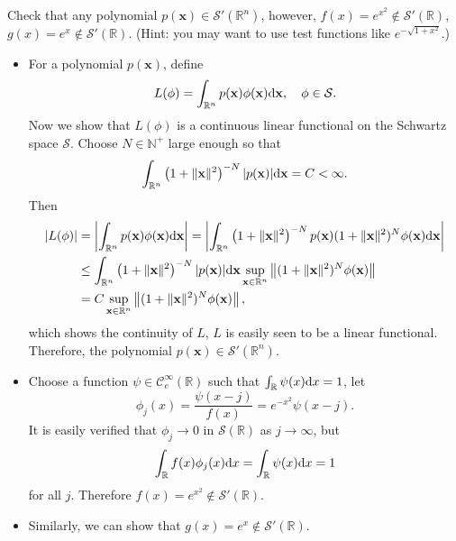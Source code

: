 \begin{pro}
  Check that any polynomial
  $p(\mathbf{x})\in\mathcal{S}'(\mathbb{R}^n)$,
  however,
  $f(x)=e^{x^2}\notin\mathcal{S}'(\mathbb{R})$,
  $g(x)=e^x\notin\mathcal{S}'(\mathbb{R})$.
  (Hint: you may want to use test functions like
  $e^{-\sqrt{1+x^2}}$.)
\end{pro}

\begin{sol}
  \begin{itemize}
  \item
  For a polynomial $p(\mathbf{x})$,
  define
  \begin{displaymath}
    L(\phi) = \int_{\mathbb{R}^n}p(\mathbf{x})\phi(\mathbf{x})\mathrm{d}\mathbf{x}, \quad \phi\in\mathcal{S}.
  \end{displaymath}
  Now we show that $L(\phi)$
  is a continuous linear functional on the Schwartz
  space $\mathcal{S}$.
  Choose $N\in\mathbb{N}^+$ large enough so that
  \begin{displaymath}
    \int_{\mathbb{R}^n}\left( 1+\|\mathbf{x}\|^2\right)^{-N}
    |p(\mathbf{x})|\mathrm{d}\mathbf{x} = C < \infty.
  \end{displaymath}
  Then
  \begin{align*}
    |L(\phi)| &= \left|\int_{\mathbb{R}^n}p(\mathbf{x})\phi(\mathbf{x})\mathrm{d}\mathbf{x}\right| =
                \left|\int_{\mathbb{R}^n}\left(
                1+\|\mathbf{x}\|^2\right)^{-N}p(\mathbf{x})
                (1+\|\mathbf{x}\|^2)^N\phi(\mathbf{x})\mathrm{d}\mathbf{x}\right| \\
    &\le \int_{\mathbb{R}^n}\left( 1+\|\mathbf{x}\|^2\right)^{-N}
      |p(\mathbf{x})|\mathrm{d}\mathbf{x}
      \sup_{\mathbf{x}\in\mathbb{R}^n}\left\|(1+\|\mathbf{x}\|^2)^N\phi(\mathbf{x})\right\| \\
    &= C\sup_{\mathbf{x}\in\mathbb{R}^n}\left\|(1+\|\mathbf{x}\|^2)^N\phi(\mathbf{x})\right\|,
  \end{align*}
  which shows the continuity of $L$,
  $L$ is easily seen to be a linear functional.
  Therefore,
  the polynomial $p(\mathbf{x})\in\mathcal{S}'(\mathbb{R}^n)$.

\item
  Choose a function $\psi\in\mathcal{C}_c^{\infty}(\mathbb{R})$ such that
  $\int_{\mathbb{R}}\psi(x)\mathrm{d} x = 1$,
  let
  \begin{displaymath}
    \phi_j(x) = \frac{\psi(x-j)}{f(x)} =
    e^{-x^2}\psi(x-j).
  \end{displaymath}
  It is easily verified that $\phi_j\to 0$ in
  $\mathcal{S}(\mathbb{R})$ as $j\to\infty$,
  but
  \begin{displaymath}
    \int_{\mathbb{R}}f(x)\phi_j(x)\mathrm{d} x =
    \int_{\mathbb{R}}\psi(x)\mathrm{d} x = 1
  \end{displaymath}
  for all $j$. Therefore $f(x)=e^{x^2}\notin
  \mathcal{S}'(\mathbb{R})$.

\item
  Similarly, we can show that $g(x)=e^x\notin\mathcal{S}'(\mathbb{R})$.
\end{itemize}
\end{sol}
